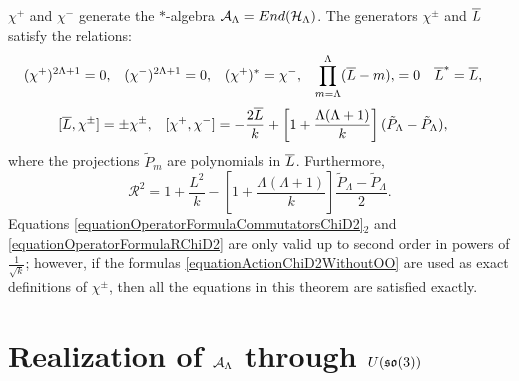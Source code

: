 \begin{theorem}[Summary]
$\chi^+$ and $\chi^-$ generate the $*$-algebra $\mathcal A_\Lambda = End(\mathcal H_\Lambda)$. The generators $\chi^\pm$ and $\overline{L}$ satisfy  the relations:
\begin{align}\label{equationOperatorFormulaRelationsChiD2}
    (\chi^+)^{2\Lambda+1} &= 0, & 
    (\chi^-)^{2\Lambda+1} &= 0, & 
    (\chi^+)^*&= \chi^-, & 
    \prod_{m = \Lambda}^\Lambda (\overline{L} - m), &= 0 & 
    \overline{L}^* &= \overline{L},
\end{align}
\begin{align}\label{equationOperatorFormulaCommutatorsChiD2}
    [\overline{L}, \chi^\pm] &= \pm \chi^\pm,&
    [\chi^+, \chi^-] &= - \frac{2\overline{L}}{k} + \left[ 1 + \frac{\Lambda(\Lambda+1)}{k}\right](\tilde P_\Lambda - \tilde P_\Lambda),
\end{align}
where the projections $\tilde P_m$ are polynomials in $\overline{L}$. Furthermore,
\begin{equation}\label{equationOperatorFormulaRChiD2}
    \mathcal R^2 = 1 + \frac{L^2}{k} - \left[ 1 + \frac{\Lambda(\Lambda+1)}{k}\right]\frac{\tilde P_\Lambda - \tilde P_\Lambda}{2}.
\end{equation}
Equations \eqref{equationOperatorFormulaCommutatorsChiD2}$_2$ and \eqref{equationOperatorFormulaRChiD2} are only valid up to second order in powers of $\frac{1}{\sqrt{k}}$; however, if the formulas \eqref{equationActionChiD2WithoutOO} are used as exact definitions of $\chi^\pm$, then all the equations in this theorem are satisfied exactly.
\end{theorem}

\linea







\section{Realization of $\mathcal A_\Lambda$ through $U(\mathfrak{so}(3))$}

